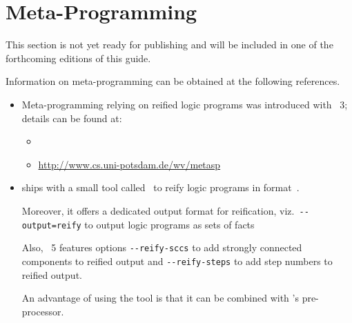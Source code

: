 \section{Meta-Programming}\label{sec:meta}

This section is not yet ready for publishing
and will be included in one of the forthcoming editions of this guide.

Information on meta-programming can be obtained at the following references.

\begin{itemize}
\item Meta-programming relying on reified logic programs was introduced with \gringo~3;
  details can be found at:
  \begin{itemize}
  \item \cite{gekasc11b}
  \item \url{http://www.cs.uni-potsdam.de/wv/metasp}
  \end{itemize}

\item \gringo{} ships with a small tool called \reify\ to reify logic programs in \aspif{} format~\cite{kascwa17a}.

  Moreover, it offers a dedicated output format for reification, viz.\
  \lstinline{--output=reify}
  to output logic programs as sets of facts

  Also, \gringo~5 features options
  \lstinline{--reify-sccs}
  to add strongly connected components to reified output
  and
  \lstinline{--reify-steps}
  to add step numbers to reified output.

  An advantage of using the \reify{} tool is that it can be combined with \clasp's pre-processor.
\end{itemize}

